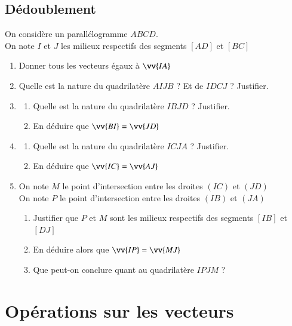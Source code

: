 \documentclass[oneside,12pt]{article}          %
\begin{document}
\subsection{Dédoublement}
On considère un parallélogramme $ABCD$. \\
On note $I$ et $J$ les milieux respectifs des segments $[AD]$ et $[BC]$
\begin{enumerate}
	\item Donner tous les vecteurs égaux à $\vv{IA}$
	\item Quelle est la nature du quadrilatère $AIJB$ ? Et de $IDCJ$ ? Justifier.
	\item \begin{enumerate}
		\item Quelle est la nature du quadrilatère $IBJD$ ? Justifier.
		\item En déduire que $\vv{BI}=\vv{JD}$
	\end{enumerate}
	\item \begin{enumerate}
		\item Quelle est la nature du quadrilatère $ICJA$ ? Justifier.
		\item En déduire que $\vv{IC}=\vv{AJ}$
	\end{enumerate}
	\item On note $M$ le point d'intersection entre les droites $(IC)$ et $(JD)$ \\
	On note $P$ le point d'intersection entre les droites $(IB)$ et $(JA)$
	\begin{enumerate}
		\item Justifier que $P$ et $M$ sont les milieux respectifs des segments $[IB]$ et $[DJ]$
		\item En déduire alors que $\vv{IP}=\vv{MJ}$
		\item Que peut-on conclure quant au quadrilatère $IPJM$ ?
	\end{enumerate}
\end{enumerate}



\section{Opérations sur les vecteurs}
\end{document}
